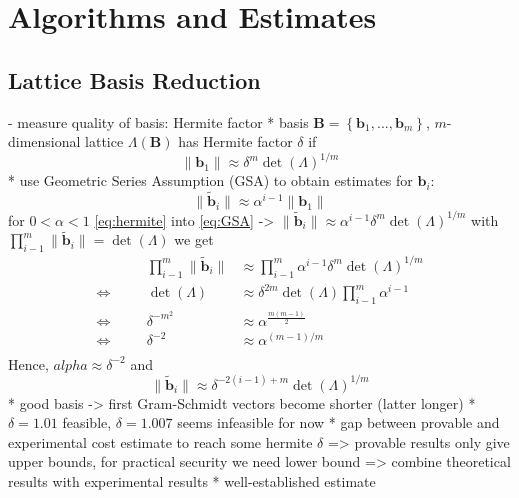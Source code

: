 \documentclass[
  a4paper,  %
  twoside,  %
  bibliography=totoc,
  headsepline,
  cleardoublepage=empty,
  parskip=half,
  draft=false
]{scrbook}
\begin{document}
\chapter{Algorithms and Estimates}


\section{Lattice Basis Reduction} %
- measure quality of basis: Hermite factor  %
  * basis $\textbf{B} = \left\{\textbf{b}_1, ..., \textbf{b}_m\right\}$, $m$-dimensional lattice $\Lambda(\textbf{B})$ has Hermite factor $\delta$ if
  \begin{equation} \label{eq:hermite}
    \| \textbf{b}_1 \| \approx \delta^m \det(\Lambda)^{1/m}
  \end{equation}
  * use Geometric Series Assumption (GSA) to obtain estimates for $\textbf{b}_i$: %
    \begin{equation} \label{eq:GSA}
      \| \tilde{\textbf{b}}_i \| \approx \alpha^{i-1} \| \textbf{b}_1 \|
    \end{equation}
    for $0 < \alpha < 1$
    \ref{eq:hermite} into \ref{eq:GSA} -> $\| \tilde{\textbf{b}}_i \| \approx \alpha^{i-1} \delta^m \det(\Lambda)^{1/m}$
    with $\prod_{i-1}^m \| \tilde{\textbf{b}}_i \| = \det(\Lambda)$ we get 
    \begin{align*}
      &\quad& \prod_{i-1}^m \| \tilde{\textbf{b}}_i \| &\approx \prod_{i-1}^m \alpha^{i-1} \delta^m \det(\Lambda)^{1/m} \\
      \Leftrightarrow&\quad& \det(\Lambda) &\approx \delta^{2m} \det(\Lambda) \prod_{i-1}^m \alpha^{i-1}\\
      \Leftrightarrow&\quad& \delta^{-m^2}  &\approx \alpha^{\frac{m(m-1)}{2}}\\
      \Leftrightarrow&\quad& \delta^{-2}  &\approx \alpha^{(m-1)/m}\\
    \end{align*}
    Hence, $alpha \approx \delta^{-2}$ and 
    \begin{equation}
      \| \tilde{\textbf{b}}_i \| \approx \delta^{-2(i-1) + m} \det(\Lambda)^{1/m}
    \end{equation}
  * good basis -> first Gram-Schmidt vectors become shorter (latter longer)
  * $\delta = 1.01$ feasible, $\delta = 1.007$ seems infeasible for now
  * gap between provable and experimental cost estimate to reach some hermite $\delta$ => provable results only give upper bounds, for practical security we need lower bound => combine theoretical results with experimental results
  * well-established estimate \cite{LP11}
\end{document}
